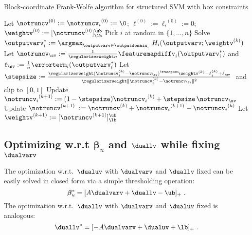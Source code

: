 \documentclass{article}
\begin{document}
\begin{algorithm}[t]
    \caption{Block-coordinate Frank-Wolfe algorithm for structured SVM with box constraints}%
    \label{alg:FW_product_SVM_box}
    \begin{algorithmic}[1]
        \STATE Let $\notruncv^{(0)}:= {\notruncv_i}^{(0)} := \0$; \; $\ell^{(0)}:={\ell_i}^{(0)}:=0$;
        \STATE $\weightv^{(0)}:= [ \notruncv^{(0)} ]_{\lb}^{\ub}$
        \STATE Pick $i$ at random in $\{1,\ldots,n\}$
        \STATE Solve $\outputvarv_i^* := \displaystyle\argmax_{\outputvarv\in\outputdomain_i} \ H_i(\outputvarv;\weightv^{(k)})$ %
        \STATE Let $\notruncv_{\sv} := \frac1{\regularizerweight n} \featuremapdiffv_i(\outputvarv_i^*)$
        \; and \;  $\ell_{\sv} := \frac1n \errorterm_i(\outputvarv_i^*)$
        \STATE Let $\stepsize := \frac{ \regularizerweight (\notruncv_i^{(k)}-\notruncv_{\sv})^\transpose \weightv^{(k)} - \ell_i^{(k)} + \ell_{\sv} }{ \regularizerweight \|\notruncv_i^{(k)}-\notruncv_{\sv}\|^2}$~and clip to $[0,1]$ \label{alg:lineStepsizeBCFWpositive}
        \STATE Update ${\notruncv_i}^{(k+1)}:= (1-\stepsize){\notruncv_i}^{(k)}+\stepsize \,\notruncv_{\sv}$
        \STATE Update $\notruncv^{(k+1)}\;:= \notruncv^{(k)} + {\notruncv_i}^{(k+1)} - {\notruncv_i}^{(k)}$
        \STATE Let $\weightv^{(k+1)}:= [ \notruncv^{(k+1)} ]_{\lb}^{\ub}$
        \ENDFOR
    \end{algorithmic}
\end{algorithm}



\subsection{Optimizing w.r.t \texorpdfstring{$\bm{\beta}_u$}{betaU} and \texorpdfstring{$\duallv$}{betaL} while fixing \texorpdfstring{$\dualvarv$}{alpha}}

The optimization w.r.t.~$\dualuv$ with $\dualvarv$ and $\duallv$ fixed can be easily solved in closed form via a simple thresholding operation:
\begin{equation}
\label{eq:optimalBetaU}
\bm{\beta}_u^* = [A\dualvarv + \duallv - \ub ]_+ \ .
\end{equation}
The optimization w.r.t.~$\duallv$ with $\dualvarv$ and $\dualuv$ fixed is analogous:
\begin{equation}
\label{eq:optimalBetaL}
\duallv^* = [ - A\dualvarv + \dualuv + \lb ]_+ \ .
\end{equation}
\end{document}
